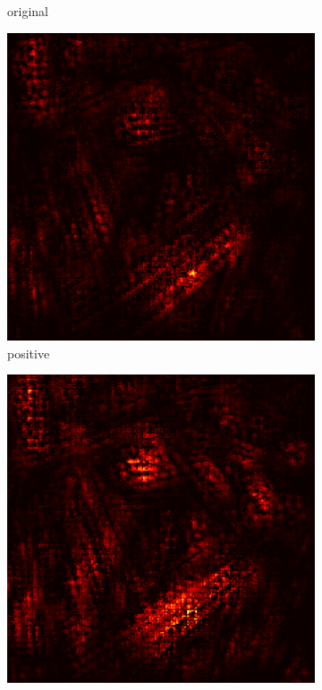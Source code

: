\documentclass[preprint,12pt]{elsarticle}
\begin{document}
\begin{figure}
\begin{subfigure}{0.14\linewidth}
        \caption{original}
    \end{subfigure}
    \hfill
    \begin{subfigure}{0.14\textwidth}
        \centering
        \includegraphics[width=\linewidth]{../visualizations/examples/imagenette/cnn/positive_saliency_map/2.png}
        \caption{positive}
    \end{subfigure}
    \hfill
    \begin{subfigure}{0.14\textwidth}
        \centering
        \includegraphics[width=\linewidth]{../visualizations/examples/imagenette/cnn/negative_saliency_map/2.png}

\end{subfigure}
\end{figure}
\end{document}
